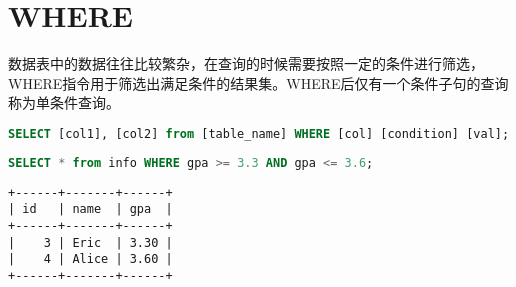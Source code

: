 \documentclass[12pt, openany, oneside]{book}
\begin{document}
\vspace{0.5cm}

\section{WHERE}

数据表中的数据往往比较繁杂，在查询的时候需要按照一定的条件进行筛选，WHERE指令用于筛选出满足条件的结果集。WHERE后仅有一个条件子句的查询称为单条件查询。

\vspace{-0.5cm}

\begin{lstlisting}[language=SQL]
SELECT [col1], [col2] from [table_name] WHERE [col] [condition] [val];
\end{lstlisting}

\begin{table}[H]
	\centering
	\caption{运算符}
\end{table}


\begin{lstlisting}[language=SQL]
SELECT * from info WHERE gpa >= 3.3 AND gpa <= 3.6;
\end{lstlisting}

\begin{tcolorbox}
	\begin{verbatim}
+------+-------+------+
| id   | name  | gpa  |
+------+-------+------+
|    3 | Eric  | 3.30 |
|    4 | Alice | 3.60 |
+------+-------+------+
\end{verbatim}
\end{tcolorbox}
\end{document}
